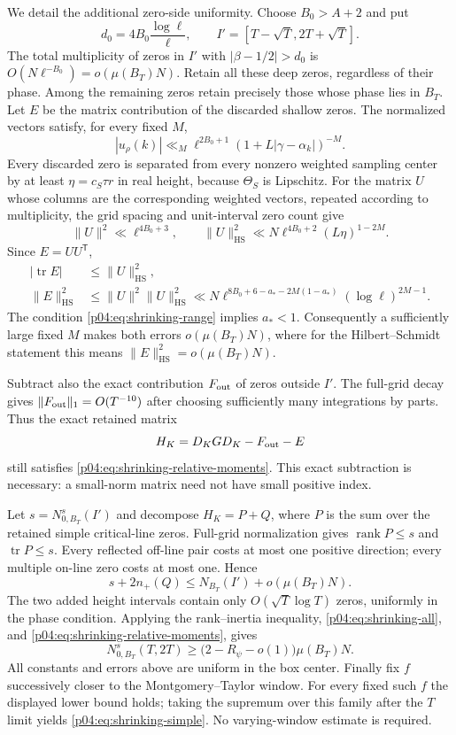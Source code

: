 \documentclass[11pt,letterpaper]{article}
\theoremstyle{definition}
\theoremstyle{remark}
\DeclareMathOperator{\rank}{rank}
\DeclareMathOperator{\tr}{tr}
\newcommand{\1}{\mathbf 1}
\begin{document}
We detail the additional zero-side uniformity. Choose $B_0>A+2$
and put
\[
 d_0=4B_0\frac{\log\ell}{\ell},
 \qquad I'=[T-\sqrt T,2T+\sqrt T].
\]
The total multiplicity of zeros in $I'$ with
$|\beta-1/2|>d_0$ is $O(N\ell^{-B_0})=o(\mu(B_T)N)$.
Retain all these deep zeros, regardless of their phase.  Among the
remaining zeros retain precisely those whose phase lies in $B_T$.
Let $E$ be the matrix contribution of the discarded shallow zeros.
The normalized vectors satisfy, for every fixed $M$,
\[
 |u_\rho(k)|\ll_M
 \ell^{2B_0+1}(1+L|\gamma-\alpha_k|)^{-M}.
\]
Every discarded zero is separated from every nonzero weighted
sampling center by at least
$\eta=c_S\tau r$ in real height, because $\Theta_S$ is Lipschitz.
For the matrix $U$ whose columns are the corresponding weighted
vectors, repeated according to multiplicity, the grid spacing and
unit-interval zero count give
\[
 \|U\|^2\ll\ell^{4B_0+3},\qquad
 \|U\|_{\mathrm{HS}}^2
   \ll N\ell^{4B_0+2}(L\eta)^{1-2M}.
\]
Since $E=UU^{\mathsf T}$,
\begin{align*}
 |\tr E|&\le\|U\|_{\mathrm{HS}}^2,\\
 \|E\|_{\mathrm{HS}}^2
 &\le\|U\|^2\|U\|_{\mathrm{HS}}^2
 \ll N\ell^{8B_0+6-a_*-2M(1-a_*)}
                         (\log\ell)^{2M-1}.
\end{align*}
The condition \eqref{p04:eq:shrinking-range} implies $a_*<1$.
Consequently a sufficiently large fixed $M$ makes both errors
$o(\mu(B_T)N)$, where for the Hilbert--Schmidt statement this means
$\|E\|_{\mathrm{HS}}^2=o(\mu(B_T)N)$.

Subtract also the exact contribution $F_{\rm out}$ of zeros outside
$I'$. The full-grid decay gives $\|F_{\rm out}\|_1=O(T^{-10})$
after choosing sufficiently many integrations by parts.  Thus the
exact retained matrix
\[
 H_K=D_KGD_K-F_{\rm out}-E
\]
still satisfies \eqref{p04:eq:shrinking-relative-moments}.  This exact
subtraction is necessary: a small-norm matrix need not have small
positive index.

Let $s=N^s_{0,B_T}(I')$ and decompose $H_K=P+Q$, where $P$ is the
sum over the retained simple critical-line zeros.  Full-grid
normalization gives $\rank P\le s$ and $\tr P\le s$.
Every reflected off-line pair costs at most one positive direction;
every multiple on-line zero costs at most one. Hence
\[
 s+2n_+(Q)\le N_{B_T}(I')+o(\mu(B_T)N).
\]
The two added height intervals contain only $O(\sqrt T\log T)$
zeros, uniformly in the phase condition. Applying the rank--inertia
inequality, \eqref{p04:eq:shrinking-all}, and
\eqref{p04:eq:shrinking-relative-moments}, gives
\[
 N^s_{0,B_T}(T,2T)
 \ge\bigl(2-R_\psi-o(1)\bigr)\mu(B_T)N.
\]
All constants and errors above are uniform in the box center.
Finally fix $f$ successively closer to the Montgomery--Taylor
window. For every fixed such $f$ the displayed lower bound holds;
taking the supremum over this family after the $T$ limit yields
\eqref{p04:eq:shrinking-simple}. No varying-window estimate is required.
\end{document}
